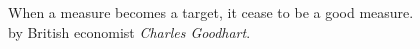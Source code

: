 \documentclass[aspectratio=169]{beamer}
\begin{document}
\begin{frame}

{\LARGE When a measure becomes a target, it cease to be a good measure.}\\ 
{by British economist \textit{Charles Goodhart}.}

\end{frame}
\end{document}

